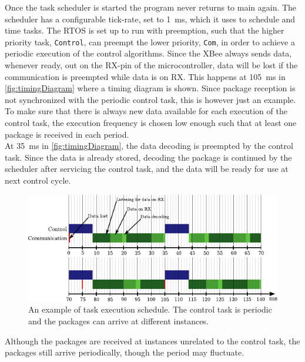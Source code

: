 Once the task scheduler is started the program never returns to main again. The scheduler has a configurable tick-rate, set to \SI{1}{ms}, which it uses to schedule and time tasks. The RTOS is set up to run with preemption, such that the higher priority task, \lstinline[style=customcppinline]{Control}, can preempt the lower priority, \lstinline[style=customcppinline]{Com}, in order to achieve a periodic execution of the control algorithms. Since the XBee always sends data, whenever ready, out on the RX-pin of the microcontroller, data will be lost if the communication is preempted while data is on RX. This happens at \SI{105}{ms} in \autoref{fig:timingDiagram} where a timing diagram is shown. Since package reception is not synchronized with the periodic control task, this is however just an example.\\
To make sure that there is always new data available for each execution of the control task, the execution frequency is chosen low enough such that at least one package is received in each period.\\
At \SI{35}{ms} in \autoref{fig:timingDiagram}, the data decoding is preempted by the control task. Since the data is already stored, decoding the package is continued by the scheduler after servicing the control task, and the data will be ready for use at next control cycle.

\begin{figure}[H]
    \flushleft
    \includegraphics[width =.95\textwidth]{figures/timingDiagram}	
    \caption{An example of task execution schedule. The control task is periodic and the packages can arrive at different instances.} 
    \label{fig:timingDiagram}
\end{figure}

Although the packages are received at instances unrelated to the control task, the packages still arrive periodically, though the period may fluctuate.